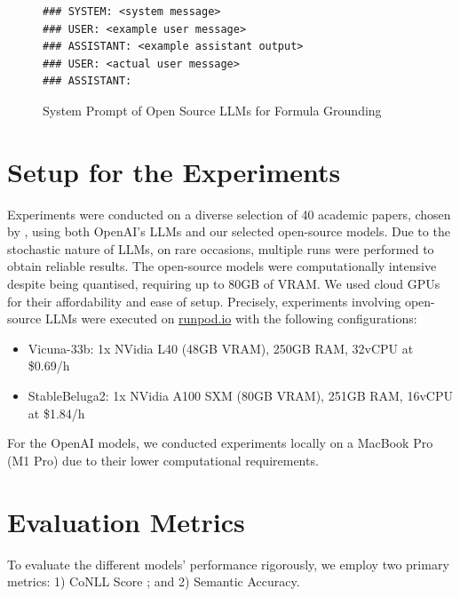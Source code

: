 \begin{figure}[htpb]
  \centering
  \begin{lstlisting}
### SYSTEM: <system message>
### USER: <example user message>
### ASSISTANT: <example assistant output>
### USER: <actual user message>
### ASSISTANT:
  \end{lstlisting}
  \caption[System Prompt for Annotation]{System Prompt of Open Source LLMs for Formula Grounding}\label{fig:open-source-prompt-structure}
\end{figure}

\section{Setup for the Experiments}

Experiments were conducted on a diverse selection of 40 academic papers, chosen by \citet{asakura2022building}, using both OpenAI's LLMs and our selected open-source models. Due to the stochastic nature of LLMs, on rare occasions, multiple runs were performed to obtain reliable results. The open-source models were computationally intensive despite being quantised, requiring up to 80GB of VRAM. We used cloud GPUs for their affordability and ease of setup. Precisely, experiments involving open-source LLMs were executed on \href{https://runpod.io}{runpod.io} with the following configurations:

\begin{itemize}
    \item Vicuna-33b: 1x NVidia L40 (48GB VRAM), 250GB RAM, 32vCPU at \$0.69/h
    \item StableBeluga2: 1x NVidia A100 SXM (80GB VRAM), 251GB RAM, 16vCPU at \$1.84/h
\end{itemize}

For the OpenAI models, we conducted experiments locally on a MacBook Pro (M1 Pro) due to their lower computational requirements.

\section{Evaluation Metrics}

To evaluate the different models' performance rigorously, we employ two primary metrics: 1) CoNLL Score \citep{pradhan2012conll}; and 2) Semantic Accuracy.


